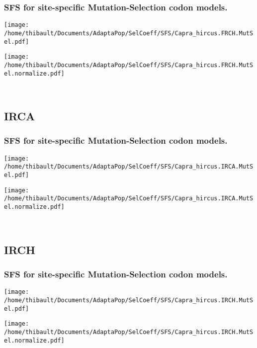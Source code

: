 \subsubsection*{SFS for site-specific Mutation-Selection codon models.} 
\begin{minipage}{0.49\linewidth} 
\texttt{[image: /home/thibault/Documents/AdaptaPop/SelCoeff/SFS/Capra\_hircus.FRCH.MutSel.pdf]} 
\end{minipage}
\begin{minipage}{0.49\linewidth}
\texttt{[image: /home/thibault/Documents/AdaptaPop/SelCoeff/SFS/Capra\_hircus.FRCH.MutSel.normalize.pdf]} 
\end{minipage}
\\ 
\subsection{IRCA} 
 
\subsubsection*{SFS for site-specific Mutation-Selection codon models.} 
\begin{minipage}{0.49\linewidth} 
\texttt{[image: /home/thibault/Documents/AdaptaPop/SelCoeff/SFS/Capra\_hircus.IRCA.MutSel.pdf]} 
\end{minipage}
\begin{minipage}{0.49\linewidth}
\texttt{[image: /home/thibault/Documents/AdaptaPop/SelCoeff/SFS/Capra\_hircus.IRCA.MutSel.normalize.pdf]} 
\end{minipage}
\\ 
\subsection{IRCH} 
 
\subsubsection*{SFS for site-specific Mutation-Selection codon models.} 
\begin{minipage}{0.49\linewidth} 
\texttt{[image: /home/thibault/Documents/AdaptaPop/SelCoeff/SFS/Capra\_hircus.IRCH.MutSel.pdf]} 
\end{minipage}
\begin{minipage}{0.49\linewidth}
\texttt{[image: /home/thibault/Documents/AdaptaPop/SelCoeff/SFS/Capra\_hircus.IRCH.MutSel.normalize.pdf]} 
\end{minipage}
\\ 
